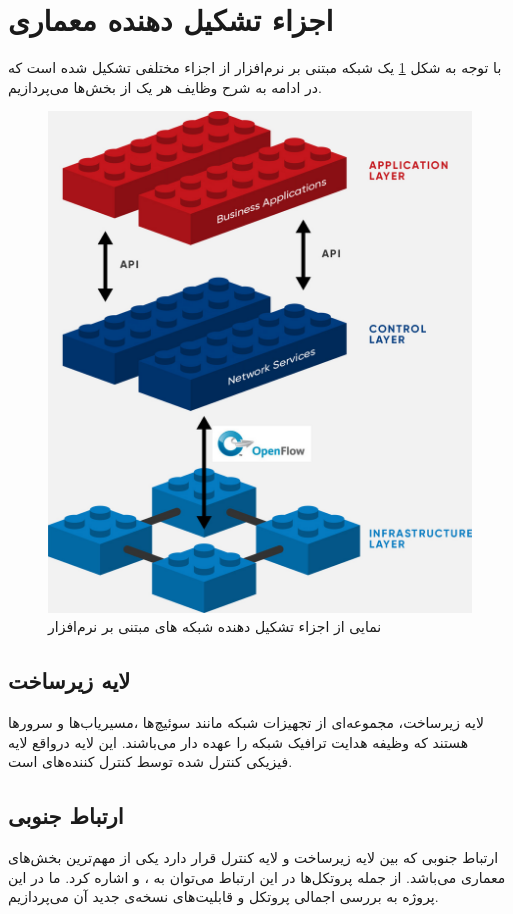\section{اجزاء تشکیل دهنده معماری }
با توجه به شکل \ref{fig2} یک شبکه مبتنی بر نرم‌افزار از اجزاء مختلفی تشکیل شده است که در ادامه به شرح وظایف هر یک از بخش‌ها می‌پردازیم.
\begin{figure}
	\centering
	\includegraphics[scale=0.2]{imgs/sdn-architecture-img.jpg}
	\caption{نمایی از اجزاء تشکیل دهنده شبکه های مبتنی بر نرم‌افزار}
	\label{fig2}
\end{figure}

\subsection{لایه زیرساخت}
لایه زیرساخت، مجموعه‌ای از تجهیزات شبکه مانند سوئیچ‌ها ،مسیریاب‌ها و سرور‌ها هستند که وظیفه هدایت ترافیک شبکه را عهده دار می‌باشند. این لایه درواقع لایه فیزیکی کنترل شده توسط کنترل کننده‌های  است.

\subsection{ارتباط جنوبی}
ارتباط جنوبی که بین لایه زیرساخت و لایه کنترل قرار دارد یکی از مهم‌ترین بخش‌های معماری  می‌باشد. از جمله پروتکل‌‌ها در این ارتباط می‌توان به  ،  و  اشاره کرد. ما در این پروژه به بررسی اجمالی پروتکل  و قابلیت‌های نسخه‌ی جدید آن می‌پردازیم.

